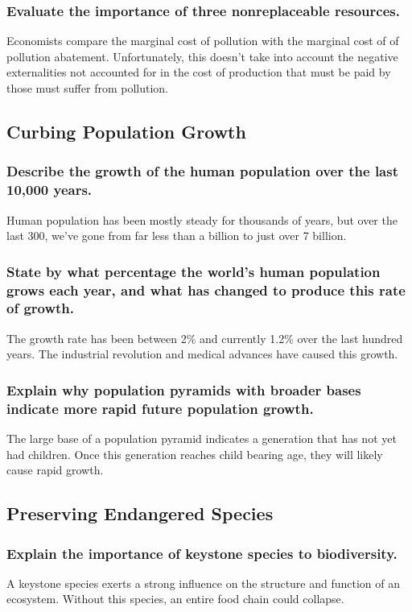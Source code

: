 \documentclass[a4paper]{article}
\begin{document}
\subsubsection{Evaluate the importance of three nonreplaceable resources.}
Economists compare the marginal cost of pollution with the marginal cost of of pollution abatement. Unfortunately, this doesn't take into account the negative
externalities not accounted for in the cost of production that must be paid by those must suffer from pollution.

\subsection{Curbing Population Growth}
\subsubsection{Describe the growth of the human population over the last 10,000 years.}
Human population has been mostly steady for thousands of years, but over the last 300, we've gone from far less than a billion to just over 7 billion.

\subsubsection{State by what percentage the world's human population grows each year, and what has changed to produce this rate of growth.}
The growth rate has been between 2\% and currently 1.2\% over the last hundred years. The industrial revolution and medical advances have caused this growth.

\subsubsection{Explain why population pyramids with broader bases indicate more rapid future population growth.}
The large base of a population pyramid indicates a generation that has not yet had children. Once this generation reaches child bearing age, they will likely
cause rapid growth.

\subsection{Preserving Endangered Species}
\subsubsection{Explain the importance of keystone species to biodiversity.}
A keystone species exerts a strong influence on the structure and function of an ecosystem. Without this species, an entire food chain could collapse.
\end{document}
